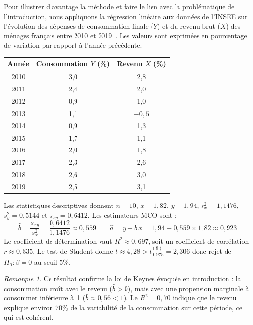 \documentclass[12pt,a4paper]{article}
\theoremstyle{definition}
\theoremstyle{remark}
\newtheorem{remarque}[theoreme]{Remarque}
\newcommand{\xbar}{\bar{x}}
\newcommand{\ybar}{\bar{y}}
\begin{document}
Pour illustrer d'avantage la méthode et faire le lien avec la problématique de l'introduction, nous appliquons la régression linéaire aux données de l'INSEE
sur l'évolution des dépenses de consommation finale ($Y$) et du revenu brut ($X$) des ménages français entre 2010 et 2019~\cite{poly2024}. Les valeurs
sont exprimées en pourcentage de variation par rapport à l'année précédente.

\begin{center}
\begin{tabular}{ccc}
\toprule
\textbf{Année} & \textbf{Consommation $Y$ (\%)} & \textbf{Revenu $X$ (\%)} \\
\midrule
2010 & 3,0 & 2,8 \\
2011 & 2,4 & 2,0 \\
2012 & 0,9 & 1,0 \\
2013 & 1,1 & $-0,5$ \\
2014 & 0,9 & 1,3 \\
2015 & 1,7 & 1,1 \\
2016 & 2,0 & 1,8 \\
2017 & 2,3 & 2,6 \\
2018 & 2,6 & 3,0 \\
2019 & 2,5 & 3,1 \\
\bottomrule
\end{tabular}
\end{center}

Les statistiques descriptives donnent $n = 10$, $\xbar = 1{,}82$, $\ybar = 1{,}94$,
$s_x^2 = 1{,}1476$, $s_y^2 = 0{,}5144$ et $s_{xy} = 0{,}6412$.
Les estimateurs MCO sont :
\[
  \hat{b} = \frac{s_{xy}}{s_x^2} = \frac{0{,}6412}{1{,}1476} \approx 0{,}559
  \qquad
  \hat{a} = \ybar - \hat{b}\,\xbar = 1{,}94 - 0{,}559 \times 1{,}82 \approx 0{,}923
\]
Le coefficient de détermination vaut $R^2 \approx 0{,}697$, soit un coefficient de
corrélation $r \approx 0{,}835$.
Le test de Student donne $t \approx 4{,}28 > t_{0{,}975}^{(8)} = 2{,}306$ donc rejet de 
 $H_0 : \beta = 0$ au seuil $5\%$.

\begin{remarque}
Ce résultat confirme la loi de Keynes évoquée en introduction : la consommation
croît avec le revenu ($\hat{b} > 0$), mais avec une propension marginale à
consommer inférieure à~1 ($\hat{b} \approx 0{,}56 < 1$). Le $R^2 = 0{,}70$
indique que le revenu explique environ $70\%$ de la variabilité de la consommation
sur cette période, ce qui est cohérent.
\end{remarque}
\end{document}
